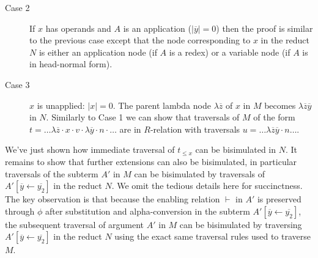 \documentclass{article}
\theoremstyle{definition}
\newcommand{\enables}{\vdash} %
\begin{document}
\begin{description}
\item[Case 2] If $x$ has operands and $A$ is an application ($|\overline{y}|=0$) then the proof is similar to the previous case except that the node corresponding to $x$ in the reduct $N$ is either an application node (if $A$ is a redex) or a variable node (if $A$ is in head-normal form).

\item[Case 3] $x$ is unapplied: $|x|=0$. The parent lambda node $\lambda\overline{z}$ of $x$ in $M$ becomes $\lambda\overline{z}\overline{y}$ in $N$. Similarly to Case 1 we can show that traversals of $M$ of the form $t = \ldots \lambda\overline{z}\cdot x \cdot v \cdot \lambda\overline{y} \cdot n \cdot \ldots$ are in $R$-relation with traversals $u = \ldots \lambda\overline{z}\overline{y}\cdot n \ldots$.
\end{description}


We've just shown how immediate traversal of $t_{\leq x}$ can be bisimulated in $N$. It remains to show that further extensions can also be bisimulated, in particular traversals of the subterm $A'$ in $M$ can be bisimulated by traversals of $A'[\overline{y}\leftarrow\overline{y_2}]$ in the reduct $N$.
We omit the tedious details here for succinctness.  The key observation is that
because the enabling relation $\enables$ in $A'$ is preserved through $\phi$ after substitution and alpha-conversion in the subterm $A'[\overline{y}\leftarrow\overline{y_2}]$, the subsequent traversal of argument $A'$ in $M$ can be bisimulated by traversing $A'[\overline{y}\leftarrow\overline{y_2}]$ in the reduct $N$ using the exact same traversal rules used to traverse $M$.
\end{document}

